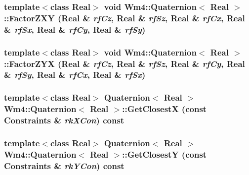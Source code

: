 \subsubsection{\setlength{\rightskip}{0pt plus 5cm}template$<$class Real$>$ void {\bf Wm4::Quaternion}$<$ Real $>$::Factor\-ZXY (Real \& {\em rf\-Cz}, Real \& {\em rf\-Sz}, Real \& {\em rf\-Cx}, Real \& {\em rf\-Sx}, Real \& {\em rf\-Cy}, Real \& {\em rf\-Sy})}\label{classWm4_1_1Quaternion_1624283bf14f6fab8c48e0d851de8d32}


\subsubsection{\setlength{\rightskip}{0pt plus 5cm}template$<$class Real$>$ void {\bf Wm4::Quaternion}$<$ Real $>$::Factor\-ZYX (Real \& {\em rf\-Cz}, Real \& {\em rf\-Sz}, Real \& {\em rf\-Cy}, Real \& {\em rf\-Sy}, Real \& {\em rf\-Cx}, Real \& {\em rf\-Sx})}\label{classWm4_1_1Quaternion_1b4c0d82c2f6873d5af2a98dcfa3064d}


\subsubsection{\setlength{\rightskip}{0pt plus 5cm}template$<$class Real$>$ {\bf Quaternion}$<$ Real $>$ {\bf Wm4::Quaternion}$<$ Real $>$::Get\-Closest\-X (const {\bf Constraints} \& {\em rk\-XCon}) const}\label{classWm4_1_1Quaternion_ceb69a5d390639469e085fc5a422d914}


\subsubsection{\setlength{\rightskip}{0pt plus 5cm}template$<$class Real$>$ {\bf Quaternion}$<$ Real $>$ {\bf Wm4::Quaternion}$<$ Real $>$::Get\-Closest\-Y (const {\bf Constraints} \& {\em rk\-YCon}) const}\label{classWm4_1_1Quaternion_834d0a6dd9494dd23e34cc6048257b4e}


